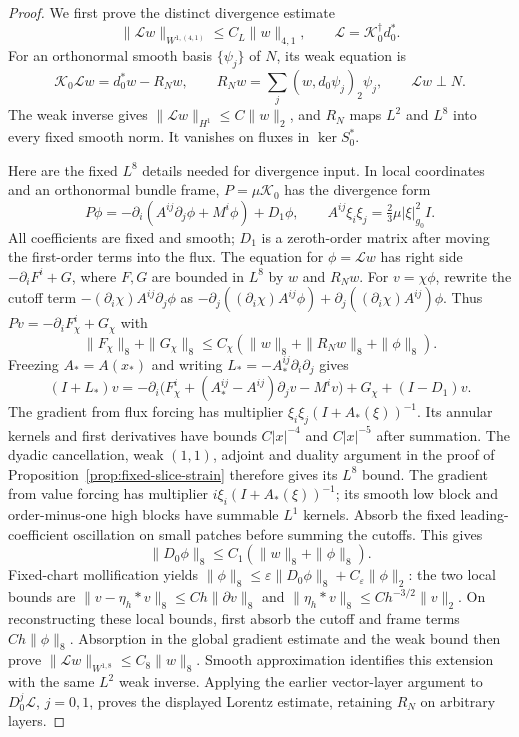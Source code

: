 \documentclass[11pt]{article}
\numberwithin{equation}{section}
\theoremstyle{definition}
\theoremstyle{remark}
\begin{document}
\begin{proof}
We first prove the distinct divergence estimate
\[
 \|\mathscr Lw\|_{W^{1,(4,1)}}\le C_L\|w\|_{4,1},
 \qquad \mathscr L=\mathcal K_0^\dagger d_0^*.
\]
For an orthonormal smooth basis $\{\psi_j\}$ of $N$, its
weak equation is
\[
 \mathcal K_0\mathscr Lw=d_0^*w-R_Nw,\qquad
 R_Nw=\sum_j(w,d_0\psi_j)_2\psi_j,\qquad
 \mathscr Lw\perp N.
\]
The weak inverse gives $\|\mathscr Lw\|_{H^1}\le C\|w\|_2$,
and $R_N$ maps $L^2$ and $L^8$ into every fixed smooth norm.
It vanishes on fluxes in $\ker S_0^*$.

Here are the fixed $L^8$ details needed for divergence input.
In local coordinates and an orthonormal bundle frame,
$P=\mu\mathcal K_0$ has the divergence form
\[
 P\phi=-\partial_i(A^{ij}\partial_j\phi+M^i\phi)+D_1\phi,
 \qquad
 A^{ij}\xi_i\xi_j=\tfrac23\mu|\xi|_{g_0}^2I.
\]
All coefficients are fixed and smooth; $D_1$ is a zeroth-order matrix
after moving the first-order terms into the flux. The equation for
$\phi=\mathscr Lw$ has right side $-\partial_iF^i+G$,
where $F,G$ are bounded in $L^8$ by $w$ and $R_Nw$.
For $v=\chi\phi$, rewrite the cutoff term
$-(\partial_i\chi)A^{ij}\partial_j\phi$ as
$-\partial_j((\partial_i\chi)A^{ij}\phi)
 +\partial_j((\partial_i\chi)A^{ij})\phi$.
Thus $Pv=-\partial_iF_\chi^i+G_\chi$ with
\[
 \|F_\chi\|_8+\|G_\chi\|_8
 \le C_\chi(\|w\|_8+\|R_Nw\|_8+\|\phi\|_8).
\]
Freezing $A_*=A(x_*)$ and writing
$L_*=-A_*^{ij}\partial_i\partial_j$ gives
\[
 (I+L_*)v
 =-\partial_i\bigl(F_\chi^i+
       (A_*^{ij}-A^{ij})\partial_jv-M^iv\bigr)
       +G_\chi+(I-D_1)v .
\]
The gradient from flux forcing has multiplier
$\xi_i\xi_j(I+A_*(\xi))^{-1}$.
Its annular kernels and first derivatives have bounds
$C|x|^{-4}$ and $C|x|^{-5}$ after summation.
The dyadic cancellation, weak $(1,1)$, adjoint and duality
argument in the proof of
Proposition~\ref{prop:fixed-slice-strain}
therefore gives its $L^8$ bound.
The gradient from value forcing has multiplier
$i\xi_i(I+A_*(\xi))^{-1}$; its smooth low block and
order-minus-one high blocks have summable $L^1$ kernels.
Absorb the fixed leading-coefficient oscillation on small
patches before summing the cutoffs. This gives
\[
 \|D_0\phi\|_8\le C_1(\|w\|_8+\|\phi\|_8).
\]
Fixed-chart mollification yields
$\|\phi\|_8\le\varepsilon\|D_0\phi\|_8+
C_\varepsilon\|\phi\|_2$:
the two local bounds are
$\|v-\eta_h*v\|_8\le Ch\|\partial v\|_8$ and
$\|\eta_h*v\|_8\le Ch^{-3/2}\|v\|_2$.
On reconstructing these local bounds, first absorb the
cutoff and frame terms $Ch\|\phi\|_8$. Absorption in
the global gradient estimate and the weak bound then prove
$\|\mathscr Lw\|_{W^{1,8}}\le C_8\|w\|_8$.
Smooth approximation identifies this extension with the
same $L^2$ weak inverse. Applying the earlier vector-layer
argument to $D_0^j\mathscr L$, $j=0,1$, proves the
displayed Lorentz estimate, retaining $R_N$ on arbitrary
layers.


\end{proof}
\end{document}
